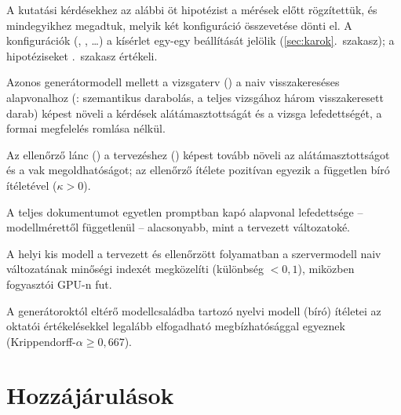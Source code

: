 A kutatási kérdésekhez az alábbi öt hipotézist a mérések előtt rögzítettük, és mindegyikhez megadtuk,
melyik két konfiguráció összevetése dönti el. A konfigurációk (, , \dots) a kísérlet egy-egy
beállítását jelölik (\ref{sec:karok}.~szakasz); a hipotéziseket \az{\ref{sec:hipotezis-ertekeles}}.~szakasz
értékeli.

\begin{hipotezis}[Tervezés]\label{h:terv}
Azonos generátormodell mellett a vizsgaterv () a naiv visszakereséses alapvonalhoz (:
szemantikus darabolás, a teljes vizsgához három visszakeresett darab) képest növeli a kérdések
alátámasztottságát és a vizsga lefedettségét, a formai megfelelés romlása nélkül.
\end{hipotezis}

\begin{hipotezis}[Ellenőrzés]\label{h:verif}
Az ellenőrző lánc () a tervezéshez () képest tovább növeli az alátámasztottságot és a vak
megoldhatóságot; az ellenőrző ítélete pozitívan egyezik a független bíró ítéletével ($\kappa>0$).
\end{hipotezis}

\begin{hipotezis}[Lefedettség]\label{h:lefed}
A teljes dokumentumot egyetlen promptban kapó alapvonal lefedettsége -- modellmérettől függetlenül --
alacsonyabb, mint a tervezett változatoké.
\end{hipotezis}

\begin{hipotezis}\label{h:helyi}
A helyi kis modell a tervezett és ellenőrzött folyamatban a szervermodell naiv változatának minőségi
indexét megközelíti (különbség $<0{,}1$), miközben fogyasztói GPU-n fut.
\end{hipotezis}

\begin{hipotezis}[Mérés]\label{h:meres}
A generátoroktól eltérő modellcsaládba tartozó nyelvi modell (bíró) ítéletei az oktatói értékelésekkel
legalább elfogadható megbízhatósággal egyeznek (Krippendorff-$\alpha\ge0{,}667$).
\end{hipotezis}

\section{Hozzájárulások}

